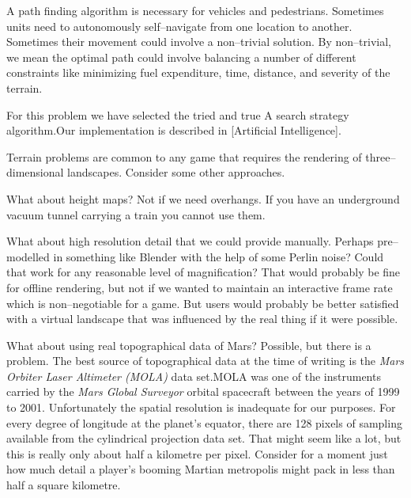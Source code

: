 
A path finding algorithm is necessary for vehicles and pedestrians. Sometimes units need to autonomously self--navigate from one location to another. Sometimes their movement could involve a non--trivial solution. By non--trivial, we mean the optimal path could involve balancing a number of different constraints like minimizing fuel expenditure, time, distance, and severity of the terrain.
\crlf

    {}

For this problem we have selected the tried and true A\high{*} search strategy algorithm. Our implementation is described in [Artificial Intelligence].

    {}

Terrain problems are common to any game that requires the rendering of three--dimensional landscapes. Consider some other approaches.

What about height maps? Not if we need overhangs. If you have an underground vacuum tunnel carrying a train you cannot use them.

What about high resolution detail that we could provide manually. Perhaps pre--modelled in something like Blender with the help of some Perlin noise? Could that work for any reasonable level of magnification? That would probably be fine for offline rendering, but not if we wanted to maintain an interactive frame rate which is non--negotiable for a game. But users would probably be better satisfied with a virtual landscape that was influenced by the real thing if it were possible.

What about using real topographical data of Mars? Possible, but there is a problem. The best source of topographical data at the time of writing is the {\it Mars Orbiter Laser Altimeter (MOLA)} data set.\footnotecite[mola] MOLA was one of the instruments carried by the {\it Mars Global Surveyor} orbital spacecraft between the years of 1999 to 2001. Unfortunately the spatial resolution is inadequate for our purposes. For every degree of longitude at the planet's equator, there are 128 pixels of sampling available from the cylindrical projection data set. That might seem like a lot, but this is really only about half a kilometre per pixel. Consider for a moment just how much detail a player's booming Martian metropolis might pack in less than half a square kilometre.

